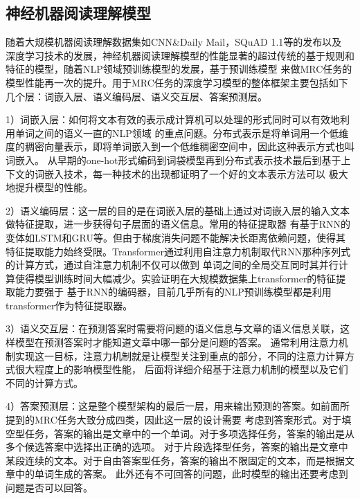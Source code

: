 \documentclass{article}
\newcommand{\upcite}[1]{\textsuperscript{\textsuperscript{\cite{#1}}}}
\begin{document}
\begin{multicols}{2}
%

%
\section{神经机器阅读理解模型}
随着大规模机器阅读理解数据集如CNN\&Daily Mail\upcite{Teaching Machines to Read and Comprehend}，SQuAD 1.1\upcite{SQuAD1}等的发布以及
深度学习技术的发展，神经机器阅读理解模型的性能显著的超过传统的基于规则和特征的模型，随着NLP领域预训练模型的发展，基于预训练模型
来做MRC任务的模型性能再一次的提升。用于MRC任务的深度学习模型的整体框架主要包括如下几个层：词嵌入层、语义编码层、语义交互层、答案预测层。

1）词嵌入层：如何将文本有效的表示成计算机可以处理的形式同时可以有效地利用单词之间的语义一直的NLP领域
的重点问题。分布式表示是将单词用一个低维度的稠密向量表示，即将单词嵌入到一个低维稠密空间中，因此这种表示方式也叫词嵌入。
从早期的one-hot形式编码到词袋模型再到分布式表示技术最后到基于上下文的词嵌入技术，每一种技术的出现都证明了一个好的文本表示方法可以
极大地提升模型的性能。

2）语义编码层：这一层的目的是在词嵌入层的基础上通过对词嵌入层的输入文本做特征提取，进一步获得句子层面的语义信息。常用的特征提取器
有基于RNN的变体如LSTM\upcite{lstm}和GRU\cite{s}等。但由于梯度消失问题不能解决长距离依赖问题，使得其
特征提取能力始终受限。Transformer\upcite{Transformer}通过利用自注意力机制取代RNN那种序列式的计算方式，通过自注意力机制不仅可以做到
单词之间的全局交互同时其并行计算使得模型训练时间大幅减少。实验证明在大规模数据集上transformer的特征提取能力要强于
基于RNN的编码器，目前几乎所有的NLP预训练模型都是利用transformer作为特征提取器。

3）语义交互层：在预测答案时需要将问题的语义信息与文章的语义信息关联，这样模型在预测答案时才能知道文章中哪一部分是问题的答案。
通常利用注意力机制实现这一目标，注意力机制就是让模型关注到重点的部分，不同的注意力计算方式很大程度上的影响模型性能，
后面将详细介绍基于注意力机制的模型以及它们不同的计算方式。

4）答案预测层：这是整个模型架构的最后一层，用来输出预测的答案。如前面所提到的MRC任务大致分成四类，因此这一层的设计需要
考虑到答案形式。对于填空型任务，答案的输出是文章中的一个单词。对于多项选择任务，答案的输出是从多个候选答案中选择出正确的选项。
对于片段选择型任务，答案的输出是文章中某段连续的文本。对于自由答案型任务，答案的输出不限固定的文本，而是根据文章中的单词生成的答案。
此外还有不可回答的问题，此时模型的输出还要考虑到问题是否可以回答。


\end{multicols}
\end{document}
